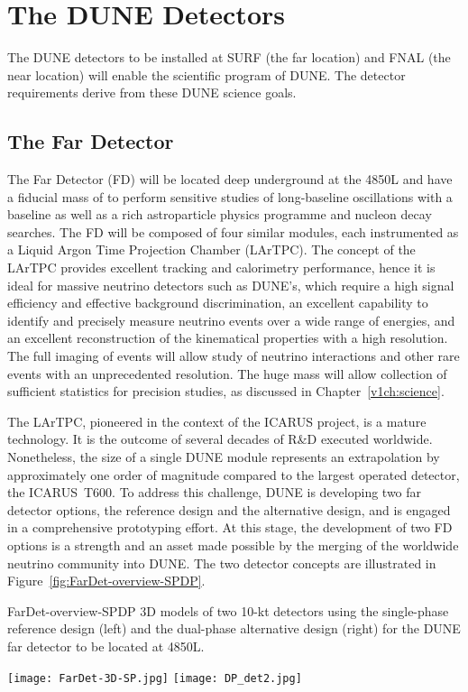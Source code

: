 \section{The DUNE Detectors}

The DUNE detectors to be installed at SURF (the far location) and FNAL (the near location) will enable the scientific program of DUNE.  The detector 
requirements derive from these DUNE science goals.

\subsection{The Far Detector}
The  Far Detector (FD) will be located deep underground at the 4850L and have
a  fiducial mass of  to perform sensitive studies of long-baseline oscillations with a  baseline as well as a rich astroparticle physics programme and nucleon decay searches. The FD  will be composed of four %
similar modules, each instrumented as a Liquid Argon Time Projection Chamber (LArTPC).
The concept of the LArTPC provides
excellent tracking and calorimetry performance, hence it is ideal for massive neutrino detectors such as DUNE's, which require a high signal efficiency and effective background discrimination,  an excellent capability to identify and  precisely measure neutrino events over a wide range of energies, and an excellent reconstruction of the kinematical properties
with a high resolution. The full imaging of events will allow study of neutrino interactions and
other rare events with an unprecedented resolution.
 The huge mass will allow collection of sufficient statistics for precision
studies, as discussed in Chapter~\ref{v1ch:science}.

The LArTPC, pioneered in the context of the ICARUS project, is a mature technology. It is the outcome
of several decades of R\&D executed worldwide.  Nonetheless, the size of a single  DUNE module represents an extrapolation by approximately one order of magnitude compared to the largest operated detector, the ICARUS~T600. To address this challenge, DUNE is developing two far detector options, the reference design and the alternative design, and is engaged in a 
comprehensive prototyping effort. At this stage, the development of two FD options is a strength and an asset
made possible by the merging of the worldwide neutrino community into DUNE.  The two detector
concepts are illustrated in Figure~\ref{fig:FarDet-overview-SPDP}.

\begin{cdrfigure}{FarDet-overview-SPDP}
{3D models of two 10-kt detectors using the single-phase reference design (left) 
and the dual-phase alternative design (right) for the DUNE far detector to be 
located at 4850L.}
\centering
\begin{minipage}[b]{1.0\textwidth}
\begin{center}
\texttt{[image: FarDet-3D-SP.jpg]}
\texttt{[image: DP\_det2.jpg]}
\end{center}
\end{minipage}
\end{cdrfigure}


